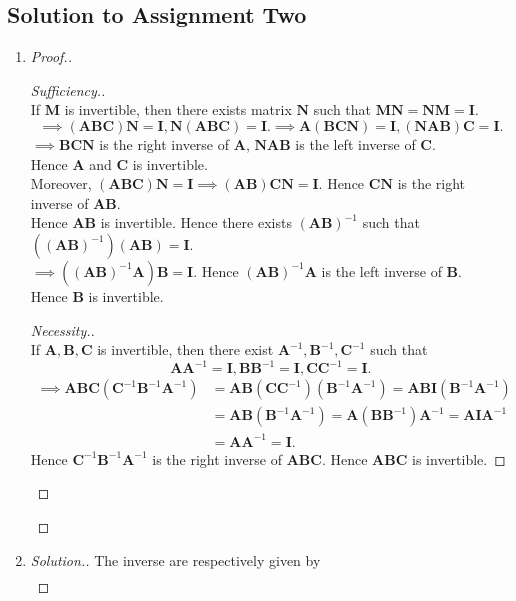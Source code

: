 \subsection{Solution to Assignment Two}
\begin{enumerate}
\item
\begin{proof}[Proof.]
\begin{proof}[Sufficiency.]\qquad \\
If $\bm M$ is invertible, then there exists matrix $\bm N$ such that $\bm M\bm N = \bm N\bm M = \bm I$.
\[\implies
(\bm{ABC})\bm N = \bm I,\bm N(\bm{ABC})=\bm I.
\implies
\bm A(\bm{BCN}) = \bm I,(\bm{NAB})\bm C = \bm I.
\]
$\implies \bm{BCN}$ is the right inverse of $\bm A$, $\bm{NAB}$ is the left inverse of $\bm C$. 
\\Hence $\bm A$ and $\bm C$ is invertible.\\
Moreover, $(\bm{ABC})\bm N = \bm I \implies (\bm{AB})\bm{CN} = \bm I$. Hence $\bm{CN}$ is the right inverse of $\bm{AB}$. 
\\Hence $\bm{AB}$ is invertible. Hence there exists $(\bm{AB})^{-1}$ such that $((\bm{AB})^{-1})(\bm{AB}) = \bm I$.\\$\implies ((\bm{AB})^{-1}\bm A)\bm B = \bm I$. Hence $(\bm{AB})^{-1}\bm A$ is the left inverse of $\bm B$. \\Hence $\bm B$ is invertible.
\begin{proof}[Necessity.]\qquad \\
If $\bm A,\bm B,\bm C$ is invertible, then there exist $\bm A^{-1},\bm B^{-1},\bm C^{-1}$ such that \[\bm A\bm A^{-1} = \bm I,\bm B\bm B^{-1} = \bm I,\bm C\bm C^{-1} = \bm I.\]
\[
\begin{split}
\implies \bm{ABC}(\bm C^{-1}\bm B^{-1}\bm A^{-1}) &=\bm{AB}(\bm C\bm C^{-1})(\bm B^{-1}\bm A^{-1}) = \bm{AB}\bm I(\bm B^{-1}\bm A^{-1}) 
\\&= \bm{AB}(\bm B^{-1}\bm A^{-1}) = \bm A(\bm B\bm B^{-1})\bm A^{-1} = \bm A\bm I\bm A^{-1} \\
&= \bm A\bm A^{-1} = \bm I.
\end{split}
\]
Hence $\bm C^{-1}\bm B^{-1}\bm A^{-1}$ is the right inverse of $\bm{ABC}$. Hence $\bm{ABC}$ is invertible.
\end{proof}
\end{proof}
\end{proof}
\item
\begin{proof}[Solution.]
The inverse are respectively given by 
\[
\begin{array}{lll}

\end{array}\]
\end{proof}
\end{enumerate}
